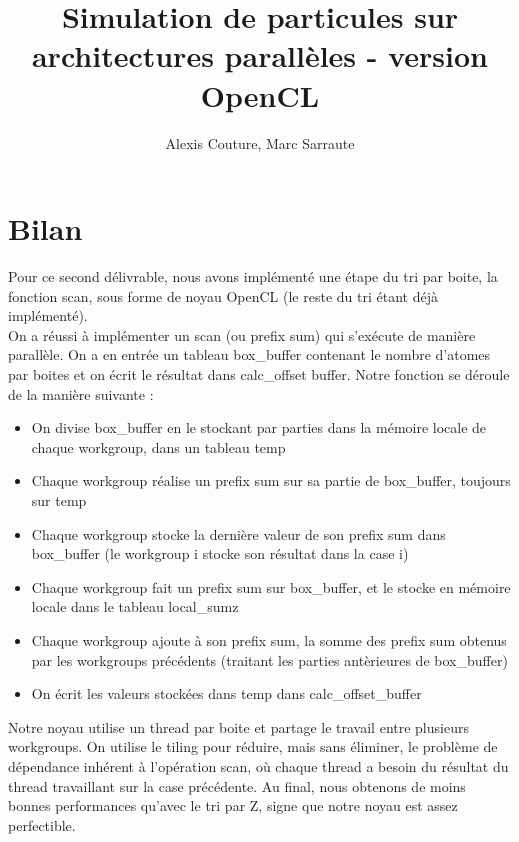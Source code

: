 \documentclass[]{article}
\title{Simulation de particules sur architectures parallèles - version OpenCL}
\author{Alexis Couture, Marc Sarraute}
\begin{document}
\maketitle

\section{Bilan}

Pour ce second délivrable, nous avons implémenté une étape du tri par boite, la fonction scan, sous forme de noyau OpenCL (le reste du tri étant déjà implémenté). \\

On a réussi à implémenter un scan (ou prefix sum) qui s'exécute de manière parallèle. On a en entrée un tableau box\_buffer contenant le nombre d'atomes par boites et on écrit le résultat dans calc\_offset buffer. Notre fonction se déroule de la manière suivante :
\\

\begin{itemize}
\item On divise box\_buffer en le stockant par parties dans la mémoire locale de chaque workgroup, dans un tableau temp
\item Chaque workgroup réalise un prefix sum sur sa partie de box\_buffer, toujours sur temp
\item Chaque workgroup stocke la dernière valeur de son prefix sum dans box\_buffer (le workgroup i stocke son résultat dans la case i)
\item Chaque workgroup fait un prefix sum sur box\_buffer, et le stocke en mémoire locale dans le tableau local\_sumz
\item Chaque workgroup ajoute à son prefix sum, la somme des prefix sum obtenus par les workgroups précédents (traitant les parties antèrieures de box\_buffer)
\item On écrit les valeurs stockées dans temp dans calc\_offset\_buffer\\
\end{itemize}

Notre noyau utilise un thread par boite et partage le travail entre plusieurs workgroups. On utilise le tiling pour réduire, mais sans éliminer, le problème de dépendance inhérent à l'opération scan, où chaque thread a besoin du résultat du thread travaillant sur la case précédente. 
Au final, nous obtenons de moins bonnes performances qu'avec le tri par Z, signe que notre noyau est assez perfectible.\\
\end{document}
